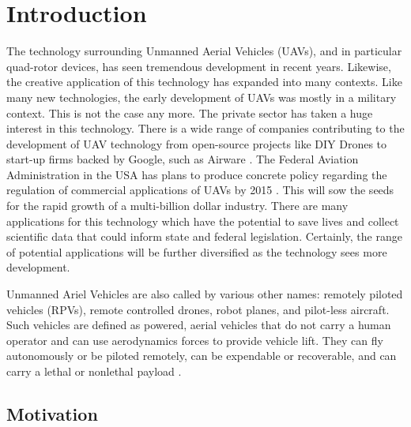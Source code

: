 
\chapter{Introduction} %

\label{Introduction} %



The technology surrounding Unmanned Aerial Vehicles (UAVs), and in particular quad-rotor devices, has seen tremendous development in recent years. Likewise, the creative application of this technology has expanded into many contexts. Like many new technologies, the early development of UAVs was mostly in a military context. This is not the case any more. The private sector has taken a huge interest in this technology. There is a wide range of companies contributing to the development of UAV technology from open-source projects like DIY Drones \cite{diydrones} to start-up firms backed by Google, such as Airware \cite{airware}.  The Federal Aviation Administration in the USA has plans to produce concrete policy regarding the regulation of commercial applications of UAVs by 2015 \cite{faa}. This will sow the seeds for the rapid growth of a multi-billion dollar industry. There are many applications for this technology which have the potential to save lives and collect scientific data that could inform state and federal legislation. Certainly, the range of potential applications will be further diversified as the technology sees more development.

Unmanned Ariel Vehicles are also called by various other names: remotely piloted vehicles (RPVs), remote controlled drones, robot planes, and pilot-less aircraft. Such vehicles are defined as powered, aerial vehicles that do not carry a human operator and can use aerodynamics forces to provide vehicle lift. They can fly autonomously or be piloted remotely, can be expendable or recoverable, and can carry a lethal or nonlethal payload \cite{bone2004unmanned}.


\section{Motivation}

